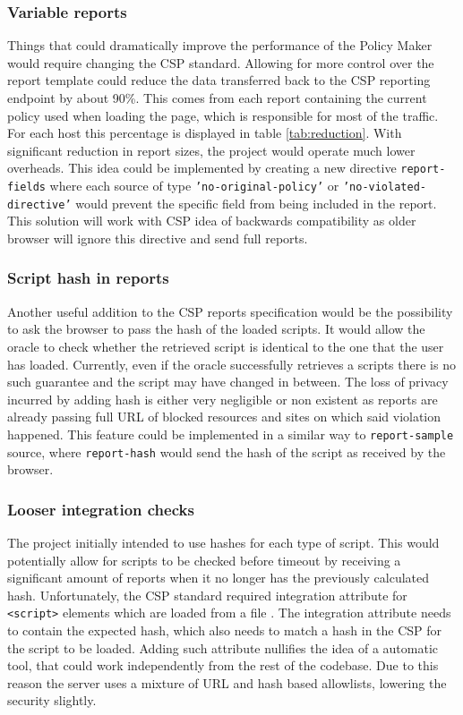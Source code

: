 \subsubsection{Variable reports}

Things that could dramatically improve the performance of the Policy Maker would require changing the CSP standard.
Allowing for more control over the report template could reduce the data transferred back to the CSP reporting endpoint by about 90\%.
This comes from each report containing the current policy used when loading the page, which is responsible for most of the traffic.
For each host this percentage is displayed in table \ref{tab:reduction}.
With significant reduction in report sizes, the project would operate much lower overheads.
This idea could be implemented by creating a new directive \texttt{report-fields} where each source of type \texttt{'no-original-policy'} or \texttt{'no-violated-directive'} would prevent the specific field from being included in the report.
This solution will work with CSP idea of backwards compatibility as older browser will ignore this directive and send full reports.



\subsubsection{Script hash in reports}

Another useful addition to the CSP reports specification would be the possibility to ask the browser to pass the hash of the loaded scripts.
It would allow the oracle to check whether the retrieved script is identical to the one that the user has loaded.
Currently, even if the oracle successfully retrieves a scripts there is no such guarantee and the script may have changed in between.
The loss of privacy incurred by adding hash is either very negligible or non existent as reports are already passing full URL of blocked resources and sites on which said violation happened.
This feature could be implemented in a similar way to \texttt{report-sample} source, where \texttt{report-hash} would send the hash of the script as received by the browser.

\subsubsection{Looser integration checks}

The project initially intended to use hashes for each type of script. 
This would potentially allow for scripts to be checked before timeout by receiving a significant amount of reports when it no longer has the previously calculated hash.
Unfortunately, the CSP standard required integration attribute for \texttt{<script>} elements which are loaded from a file \cite{externalHash}.
The integration attribute needs to contain the expected hash, which also needs to match a hash in the CSP for the script to be loaded.
Adding such attribute nullifies the idea of a automatic tool, that could work independently from the rest of the codebase.
Due to this reason the server uses a mixture of URL and hash based allowlists, lowering the security slightly.

